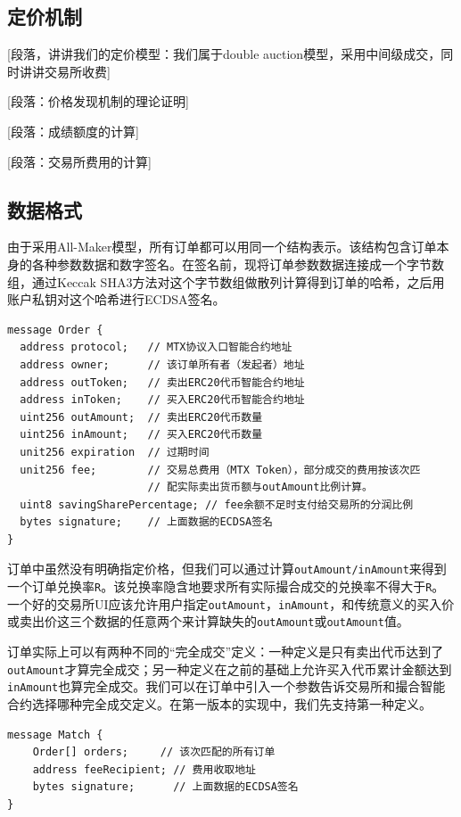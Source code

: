 \documentclass[UTF8,nofonts]{ctexart}
\begin{document}
\subsection{定价机制\label{sec:pricediscovery}}

[段落，讲讲我们的定价模型：我们属于double auction模型，采用中间级成交，同时讲讲交易所收费]

[段落：价格发现机制的理论证明]

[段落：成绩额度的计算]

[段落：交易所费用的计算]

\subsection{数据格式\label{sec:dataformat}}

由于采用All-Maker模型，所有订单都可以用同一个结构表示。该结构包含订单本身的各种参数数据和数字签名。在签名前，现将订单参数数据连接成一个字节数组，通过Keccak SHA3方法对这个字节数组做散列计算得到订单的哈希，之后用账户私钥对这个哈希进行ECDSA签名。


\begin{verbatim}
message Order {
  address protocol;   // MTX协议入口智能合约地址
  address owner;      // 该订单所有者（发起者）地址
  address outToken;   // 卖出ERC20代币智能合约地址
  address inToken;    // 买入ERC20代币智能合约地址
  uint256 outAmount;  // 卖出ERC20代币数量
  uint256 inAmount;   // 买入ERC20代币数量
  unit256 expiration  // 过期时间
  unit256 fee;        // 交易总费用（MTX Token），部分成交的费用按该次匹
                      // 配实际卖出货币额与outAmount比例计算。
  uint8 savingSharePercentage; // fee余额不足时支付给交易所的分润比例
  bytes signature;    // 上面数据的ECDSA签名
}	
\end{verbatim}

订单中虽然没有明确指定价格，但我们可以通过计算\verb|outAmount/inAmount|来得到一个订单兑换率\verb|R|。该兑换率隐含地要求所有实际撮合成交的兑换率不得大于\verb|R|。一个好的交易所UI应该允许用户指定\verb|outAmount|，\verb|inAmount|，和传统意义的买入价或卖出价这三个数据的任意两个来计算缺失的\verb|outAmount|或\verb|outAmount|值。

订单实际上可以有两种不同的“完全成交”定义：一种定义是只有卖出代币达到了\verb|outAmount|才算完全成交；另一种定义在之前的基础上允许买入代币累计金额达到\verb|inAmount|也算完全成交。我们可以在订单中引入一个参数告诉交易所和撮合智能合约选择哪种完全成交定义。在第一版本的实现中，我们先支持第一种定义。

\begin{verbatim}
message Match {
    Order[] orders;     // 该次匹配的所有订单
    address feeRecipient; // 费用收取地址
    bytes signature;      // 上面数据的ECDSA签名
}
\end{verbatim}
\end{document}
